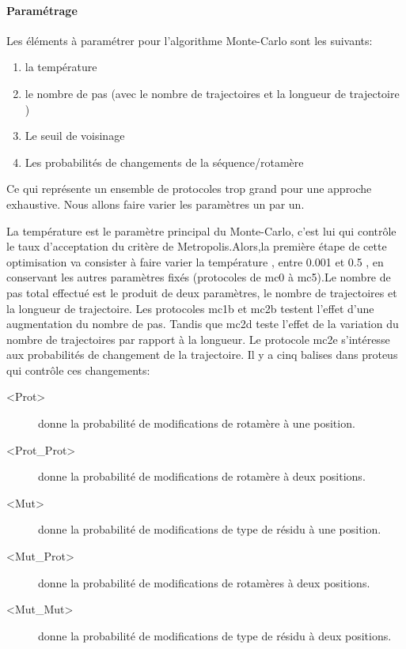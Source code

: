 \paragraph{Paramétrage}

Les éléments à paramétrer pour l'algorithme Monte-Carlo sont les suivants:

\begin{enumerate}
\item la température
\item le nombre de pas (avec le nombre de trajectoires et la longueur de trajectoire )
\item Le seuil de voisinage
\item Les probabilités de changements de la séquence/rotamère
\end{enumerate}

Ce qui représente un ensemble de protocoles trop grand pour une approche exhaustive. Nous allons faire varier les paramètres un par un.

La température est le paramètre principal du Monte-Carlo, c'est lui qui contrôle le taux d'acceptation du critère de Metropolis.Alors,la première étape de cette optimisation va consister à faire varier la température , entre 0.001 et 0.5 , en conservant les autres paramètres fixés (protocoles de mc0 à mc5).Le nombre de pas total effectué est le produit de deux paramètres, le nombre de trajectoires et la longueur de trajectoire. Les protocoles mc1b et mc2b testent l'effet d'une augmentation du nombre de pas. Tandis que mc2d teste l'effet de la variation du nombre de trajectoires par rapport à la longueur.
Le protocole mc2e s'intéresse aux probabilités de changement de la trajectoire. Il y a cinq balises dans proteus qui contrôle ces changements:

\begin{description}
\item[<Prot>] donne la probabilité de modifications de  rotamère à une position.
\item[<Prot\_Prot>] donne la probabilité de modifications de  rotamère à deux positions.
\item[<Mut>] donne la probabilité de modifications de type de résidu à une position.
\item[<Mut\_Prot>] donne la probabilité de modifications de  rotamères à deux positions.
\item[<Mut\_Mut>] donne la probabilité de modifications de type de résidu à deux positions.
\end{description}

